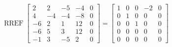 \begin{exerciseAnswer} 


\[\operatorname{RREF} \left[\begin{array}{cccc|c}
2 & 2 & -5 & -4 & 0 \\
4 & -4 & -4 & -8 & 0 \\
-6 & 2 & 1 & 12 & 0 \\
-6 & 5 & 3 & 12 & 0 \\
-1 & 3 & -5 & 2 & 0
\end{array}\right] = \left[\begin{array}{cccc|c}
1 & 0 & 0 & -2 & 0 \\
0 & 1 & 0 & 0 & 0 \\
0 & 0 & 1 & 0 & 0 \\
0 & 0 & 0 & 0 & 0 \\
0 & 0 & 0 & 0 & 0
\end{array}\right] \]



\end{exerciseAnswer}
